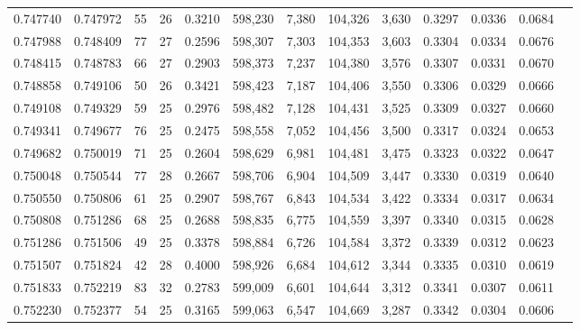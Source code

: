 \begin{tabular}{rrrrrrrrrrrrr}
0.747740 & 0.747972 &  55 &  26 &                                     0.3210 & 598,230 &   7,380 & 104,326 &   3,630 & 0.3297 & 0.0336 & 0.0684 \\
0.747988 & 0.748409 &  77 &  27 &                                     0.2596 & 598,307 &   7,303 & 104,353 &   3,603 & 0.3304 & 0.0334 & 0.0676 \\
0.748415 & 0.748783 &  66 &  27 &                                     0.2903 & 598,373 &   7,237 & 104,380 &   3,576 & 0.3307 & 0.0331 & 0.0670 \\
0.748858 & 0.749106 &  50 &  26 &                                     0.3421 & 598,423 &   7,187 & 104,406 &   3,550 & 0.3306 & 0.0329 & 0.0666 \\
0.749108 & 0.749329 &  59 &  25 &                                     0.2976 & 598,482 &   7,128 & 104,431 &   3,525 & 0.3309 & 0.0327 & 0.0660 \\
0.749341 & 0.749677 &  76 &  25 &                                     0.2475 & 598,558 &   7,052 & 104,456 &   3,500 & 0.3317 & 0.0324 & 0.0653 \\
0.749682 & 0.750019 &  71 &  25 &                                     0.2604 & 598,629 &   6,981 & 104,481 &   3,475 & 0.3323 & 0.0322 & 0.0647 \\
0.750048 & 0.750544 &  77 &  28 &                                     0.2667 & 598,706 &   6,904 & 104,509 &   3,447 & 0.3330 & 0.0319 & 0.0640 \\
0.750550 & 0.750806 &  61 &  25 &                                     0.2907 & 598,767 &   6,843 & 104,534 &   3,422 & 0.3334 & 0.0317 & 0.0634 \\
0.750808 & 0.751286 &  68 &  25 &                                     0.2688 & 598,835 &   6,775 & 104,559 &   3,397 & 0.3340 & 0.0315 & 0.0628 \\
0.751286 & 0.751506 &  49 &  25 &                                     0.3378 & 598,884 &   6,726 & 104,584 &   3,372 & 0.3339 & 0.0312 & 0.0623 \\
0.751507 & 0.751824 &  42 &  28 &                                     0.4000 & 598,926 &   6,684 & 104,612 &   3,344 & 0.3335 & 0.0310 & 0.0619 \\
0.751833 & 0.752219 &  83 &  32 &                                     0.2783 & 599,009 &   6,601 & 104,644 &   3,312 & 0.3341 & 0.0307 & 0.0611 \\
0.752230 & 0.752377 &  54 &  25 &                                     0.3165 & 599,063 &   6,547 & 104,669 &   3,287 & 0.3342 & 0.0304 & 0.0606 \\

\end{tabular}
